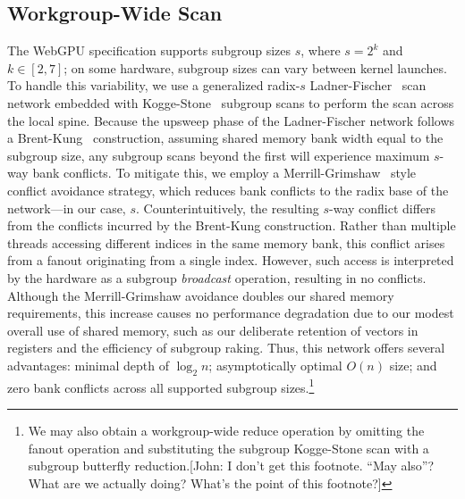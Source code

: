 \documentclass[acmsmall, manuscript, screen, review, anonymous]{acmart}
\newcommand{\john}[1]{{\footnotesize\color{cyan}[John: #1]}}
\begin{document}
\subsection{Workgroup-Wide Scan}
The WebGPU specification supports subgroup sizes $s$, where $s = 2^k$ and $k \in [2, 7]$; on some hardware, subgroup sizes can vary between kernel launches. To handle this variability, we use a generalized radix-$s$ Ladner-Fischer~\cite{10.1145/322217.322232} scan network embedded with Kogge-Stone~\cite{5009159} subgroup scans to perform the scan across the local spine. Because the upsweep phase of the Ladner-Fischer network follows a Brent-Kung~\cite{1675982} construction, assuming shared memory bank width equal to the subgroup size, any subgroup scans beyond the first will experience maximum $s$-way bank conflicts. To mitigate this, we employ a Merrill-Grimshaw~\cite[Section 3.3.5]{Merrill2009} style conflict avoidance strategy, which reduces bank conflicts to the radix base of the network—in our case, $s$. Counterintuitively, the resulting $s$-way conflict differs from the conflicts incurred by the Brent-Kung construction. Rather than multiple threads accessing different indices in the same memory bank, this conflict arises from a fanout originating from a single index. However, such access is interpreted by the hardware as a subgroup \emph{broadcast} operation, resulting in no conflicts. Although the Merrill-Grimshaw avoidance doubles our shared memory requirements, this increase causes no performance degradation due to our modest overall use of shared memory, such as our deliberate retention of vectors in registers and the efficiency of subgroup raking. Thus, this network offers several advantages: minimal depth of $\log_2 n$; asymptotically optimal $O(n)$ size; and zero bank conflicts across all supported subgroup sizes.\footnote{We may also obtain a workgroup-wide reduce operation by omitting the fanout operation and substituting the subgroup Kogge-Stone scan with a subgroup butterfly reduction.\john{I don't get this footnote. ``May also''? What are we actually doing? What's the point of this footnote?}}
\end{document}
